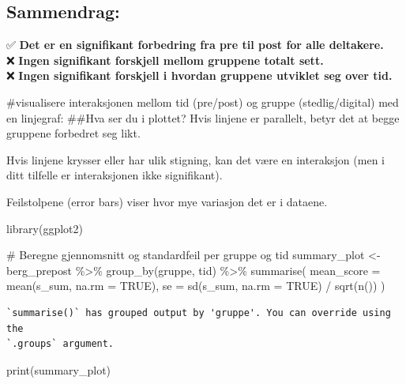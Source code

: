 \documentclass[
  letterpaper,
  DIV=11,
  numbers=noendperiod]{scrreprt}
\newenvironment{Shaded}{\begin{snugshade}}{\end{snugshade}}
\newcommand{\AttributeTok}[1]{\textcolor[rgb]{0.40,0.45,0.13}{#1}}
\newcommand{\CommentTok}[1]{\textcolor[rgb]{0.37,0.37,0.37}{#1}}
\newcommand{\ConstantTok}[1]{\textcolor[rgb]{0.56,0.35,0.01}{#1}}
\newcommand{\FunctionTok}[1]{\textcolor[rgb]{0.28,0.35,0.67}{#1}}
\newcommand{\NormalTok}[1]{\textcolor[rgb]{0.00,0.23,0.31}{#1}}
\newcommand{\OtherTok}[1]{\textcolor[rgb]{0.00,0.23,0.31}{#1}}
\newcommand{\SpecialCharTok}[1]{\textcolor[rgb]{0.37,0.37,0.37}{#1}}
\begin{document}
\hypertarget{sammendrag}{%
\subsection{\texorpdfstring{\textbf{Sammendrag:}}{Sammendrag:}}\label{sammendrag}}

✅ \textbf{Det er en signifikant forbedring fra pre til post for alle
deltakere.}\\
❌ \textbf{Ingen signifikant forskjell mellom gruppene totalt sett.}\\
❌ \textbf{Ingen signifikant forskjell i hvordan gruppene utviklet seg
over tid.}

\#visualisere interaksjonen mellom tid (pre/post) og gruppe
(stedlig/digital) med en linjegraf: \#\#Hva ser du i plottet? Hvis
linjene er parallelt, betyr det at begge gruppene forbedret seg likt.

Hvis linjene krysser eller har ulik stigning, kan det være en
interaksjon (men i ditt tilfelle er interaksjonen ikke signifikant).

Feilstolpene (error bars) viser hvor mye variasjon det er i dataene.

\begin{Shaded}
\begin{Highlighting}[]
\FunctionTok{library}\NormalTok{(ggplot2)}

\CommentTok{\# Beregne gjennomsnitt og standardfeil per gruppe og tid}
\NormalTok{summary\_plot }\OtherTok{\textless{}{-}}\NormalTok{ berg\_prepost }\SpecialCharTok{\%\textgreater{}\%}
  \FunctionTok{group\_by}\NormalTok{(gruppe, tid) }\SpecialCharTok{\%\textgreater{}\%}
  \FunctionTok{summarise}\NormalTok{(}
    \AttributeTok{mean\_score =} \FunctionTok{mean}\NormalTok{(s\_sum, }\AttributeTok{na.rm =} \ConstantTok{TRUE}\NormalTok{),}
    \AttributeTok{se =} \FunctionTok{sd}\NormalTok{(s\_sum, }\AttributeTok{na.rm =} \ConstantTok{TRUE}\NormalTok{) }\SpecialCharTok{/} \FunctionTok{sqrt}\NormalTok{(}\FunctionTok{n}\NormalTok{())}
\NormalTok{  )}
\end{Highlighting}
\end{Shaded}

\begin{verbatim}
`summarise()` has grouped output by 'gruppe'. You can override using the
`.groups` argument.
\end{verbatim}

\begin{Shaded}
\begin{Highlighting}[]
\FunctionTok{print}\NormalTok{(summary\_plot)}
\end{Highlighting}
\end{Shaded}
\end{document}
